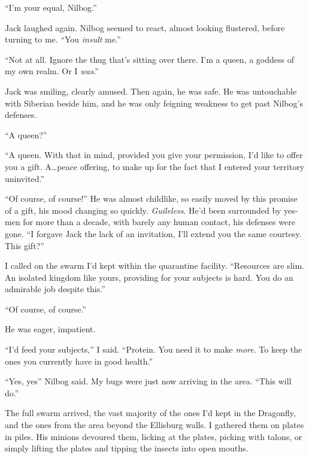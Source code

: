 ``I'm your equal, Nilbog.''



Jack laughed again.  Nilbog seemed to react, almost looking flustered, before turning to me.  ``You \emph{insult} me.''



``Not at all.  Ignore the thug that's sitting over there.  I'm a queen, a goddess of my own realm.  Or I \emph{wa}\emph{s}.''



Jack was smiling, clearly amused.  Then again, he was safe.  He was untouchable with Siberian beside him, and he was only feigning weakness to get past Nilbog's defenses.



``A queen?''



``A queen.  With that in mind, provided you give your permission, I'd like to offer you a gift.  A\ldots peace offering, to make up for the fact that I entered your territory uninvited.''



``Of course, of course!''  He was almost childlike, so easily moved by this promise of a gift, his mood changing so quickly.  \emph{Guileless}.  He'd been surrounded by yes-men for more than a decade, with barely any human contact, his defenses were gone.  ``I forgave Jack the lack of an invitation, I'll extend you the same courtesy.  This gift?''



I called on the swarm I'd kept within the quarantine facility.  ``Resources are slim.  An isolated kingdom like yours, providing for your subjects is hard.  You do an admirable job despite this.''



``Of course, of course.''



He was eager, impatient.



``I'd feed your subjects,'' I said.  ``Protein.  You need it to make \emph{more}.  To keep the ones you currently have in good health.''



``Yes, yes'' Nilbog said.  My bugs were just now arriving in the area.  ``This will do.''



The full swarm arrived, the vast majority of the ones I'd kept in the Dragonfly, and the ones from the area beyond the Ellisburg walls.  I gathered them on plates in piles.  His minions devoured them, licking at the plates, picking with talons, or simply lifting the plates and tipping the insects into open mouths.




